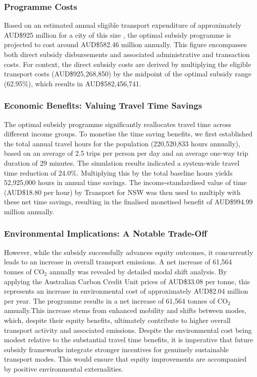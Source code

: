 \documentclass[a4paper,fleqn]{cas-sc}
\begin{document}
\subsubsection{Programme Costs}

Based on an estimated annual eligible transport expenditure of approximately AUD\$925 million for a city of this size \citep{ABS_HES_2024}, the optimal subsidy programme is projected to cost around AUD\$582.46 million annually. This figure encompasses both direct subsidy disbursements and associated administrative and transaction costs. For context, the direct subsidy costs are derived by multiplying the eligible transport costs (AUD\$925,268,850) by the midpoint of the optimal subsidy range (62.95\%), which results in AUD\$582,456,741. 

\subsubsection{Economic Benefits: Valuing Travel Time Savings}

The optimal subsidy programme significantly reallocates travel time across different income groups. To monetise the time saving benefits, we first established the total annual travel hours for the population (220,520,833 hours annually), based on an average of 2.5 trips per person per day and an average one-way trip duration of 29 minutes. The simulation results indicated a system-wide travel time reduction of 24.0\%. Multiplying this by the total baseline hours yields 52,925,000 hours in annual time savings. The income-standardised value of time (AUD\$18.80 per hour) by Transport for NSW \citep{TfNSW_2025} was then used to multiply with these net time savings, resulting in the finalised monetised benefit of AUD\$994.99 million annually.

\subsubsection{Environmental Implications: A Notable Trade-Off}

However, while the subsidy successfully advances equity outcomes, it concurrently leads to an increase in overall transport emissions. A net increase of 61,564 tonnes of CO$_2$ annually was revealed by detailed modal shift analysis. By applying the Australian Carbon Credit Unit prices \citep{CER_ACCU_2025} of AUD\$33.08 per tonne, this represents an increase in environmental cost of approximately AUD\$2.04 million per year. The programme results in a net increase of 61,564 tonnes of CO$_2$ annually.This increase stems from enhanced mobility and shifts between modes, which, despite their equity benefits, ultimately contribute to higher overall transport activity and associated emissions. Despite the environmental cost being modest relative to the substantial travel time benefits, it is imperative that future subsidy frameworks integrate stronger incentives for genuinely sustainable transport modes. This would ensure that equity improvements are accompanied by positive environmental externalities.
\end{document}
